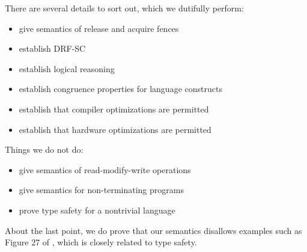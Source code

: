 There are several details to sort out, which we dutifully perform:
\begin{itemize}
\item give semantics of release and acquire fences
\item establish DRF-SC
\item establish logical reasoning
\item establish congruence properties for language constructs
\item establish that compiler optimizations are permitted
\item establish that hardware optimizations are permitted
\end{itemize}

Things we do not do:
\begin{itemize}
\item give semantics of read-modify-write operations
\item give semantics for non-terminating programs
\item prove type safety for a nontrivial language
\end{itemize}
About the last point, we do prove that our semantics disallows examples such
as Figure 27 of \cite{DBLP:journals/toplas/Lochbihler13}, which is closely
related to type safety.


